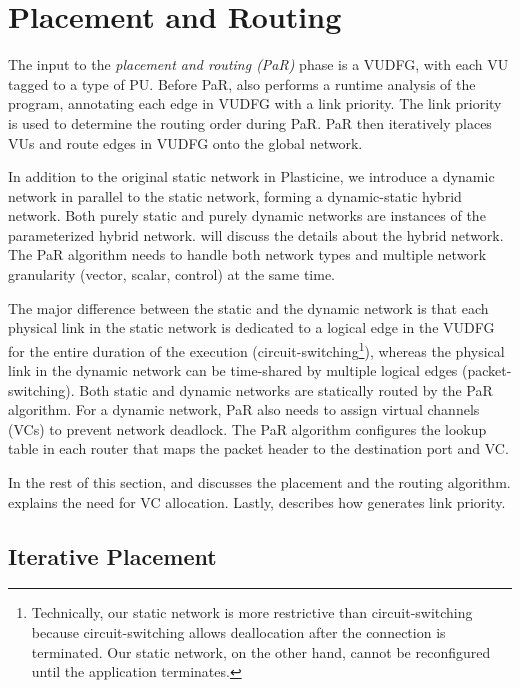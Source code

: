 \section{Placement and Routing} \label{sec:par}
The input to the \emph{placement and routing (PaR)} phase is a VUDFG, with each VU tagged to a type of PU.
Before PaR, \name also performs a runtime analysis of the program, annotating each edge in VUDFG
with a link priority. The link priority is used to determine the routing order during PaR.
PaR then iteratively places VUs and route edges in VUDFG onto the global network.

In addition to the original static network in Plasticine, we introduce a dynamic network in
parallel to the static network, forming a dynamic-static hybrid network.
Both purely static and purely dynamic networks are instances of the parameterized hybrid network.
 will discuss the details about the hybrid network.
The PaR algorithm needs to handle both network types and multiple network granularity (vector,
scalar, control) at the same time.

The major difference between the static and the dynamic network is that each physical link in the static network is dedicated to a logical edge in the VUDFG for the entire duration of the execution
(circuit-switching\footnote{Technically, our static network is more restrictive than
circuit-switching because circuit-switching allows deallocation after the connection is terminated.
Our static network, on the other hand, cannot be reconfigured until the application terminates.}), whereas 
the physical link in the dynamic network can be time-shared by multiple logical edges
(packet-switching).
Both static and dynamic networks are statically routed by the PaR algorithm. 
For a dynamic network, PaR also needs to assign virtual channels (VCs) to prevent network deadlock.
The PaR algorithm configures the lookup table in each router that maps the packet header to the
destination port and VC.

In the rest of this section,  and  discusses the placement 
and the routing algorithm. 
 explains the need for VC allocation. 
Lastly,  describes how \name generates link priority.

\subsection{Iterative Placement} \label{sec:place}


